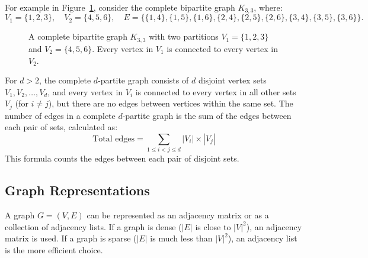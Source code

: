 For example in Figure~\ref{fig:complete_bipartite}, consider the complete bipartite graph \( K_{3,3} \), where:
\[
V_1 = \{1, 2, 3\}, \quad V_2 = \{4, 5, 6\}, \quad E = \{\{1,4\}, \{1,5\}, \{1,6\}, \{2,4\}, \{2,5\}, \{2,6\}, \{3,4\}, \{3,5\}, \{3,6\}\}.
\]

\begin{figure}[h]
\begin{center}
\caption{A complete bipartite graph \( K_{3,3} \) with two partitions \( V_1 = \{1, 2, 3\} \) and \( V_2 = \{4, 5, 6\} \). Every vertex in \( V_1 \) is connected to every vertex in \( V_2 \).}
\label{fig:complete_bipartite}
\end{center}
\end{figure}

For \( d > 2 \), the complete \( d \)-partite graph consists of \( d \) disjoint vertex sets \( V_1, V_2, \dots, V_d \), and every vertex in \( V_i \) is connected to every vertex in all other sets \( V_j \) (for \( i \neq j \)), but there are no edges between vertices within the same set. The number of edges in a complete \( d \)-partite graph is the sum of the edges between each pair of sets, calculated as:
\[
\text{Total edges} = \sum_{1 \leq i < j \leq d} |V_i| \times |V_j|
\]
This formula counts the edges between each pair of disjoint sets.

\subsection{Graph Representations}
A graph \( G = (V, E) \) can be represented as an adjacency matrix or as a collection of adjacency lists. If a graph is dense (\(|E|\) is close to \(|V|^2\)), an adjacency matrix is used. If a graph is sparse (\(|E|\) is much less than \(|V|^2\)), an adjacency list is the more efficient choice. \cite{yadav2023advanced} \cite{cormen2009introduction}


